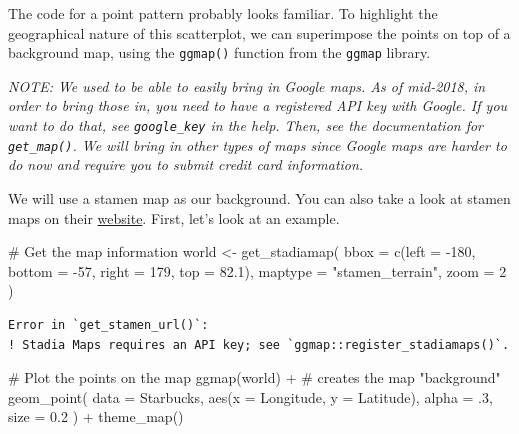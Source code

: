 \documentclass[
  letterpaper,
  DIV=11,
  numbers=noendperiod]{scrreprt}
\newenvironment{Shaded}{\begin{snugshade}}{\end{snugshade}}
\newcommand{\AttributeTok}[1]{\textcolor[rgb]{0.40,0.45,0.13}{#1}}
\newcommand{\CommentTok}[1]{\textcolor[rgb]{0.37,0.37,0.37}{#1}}
\newcommand{\DecValTok}[1]{\textcolor[rgb]{0.68,0.00,0.00}{#1}}
\newcommand{\FloatTok}[1]{\textcolor[rgb]{0.68,0.00,0.00}{#1}}
\newcommand{\FunctionTok}[1]{\textcolor[rgb]{0.28,0.35,0.67}{#1}}
\newcommand{\NormalTok}[1]{\textcolor[rgb]{0.00,0.23,0.31}{#1}}
\newcommand{\OtherTok}[1]{\textcolor[rgb]{0.00,0.23,0.31}{#1}}
\newcommand{\SpecialCharTok}[1]{\textcolor[rgb]{0.37,0.37,0.37}{#1}}
\newcommand{\StringTok}[1]{\textcolor[rgb]{0.13,0.47,0.30}{#1}}
\begin{document}
The code for a point pattern probably looks familiar. To highlight the
geographical nature of this scatterplot, we can superimpose the points
on top of a background map, using the \texttt{ggmap()} function from the
\texttt{ggmap} library.

\emph{NOTE: We used to be able to easily bring in Google maps. As of
mid-2018, in order to bring those in, you need to have a registered API
key with Google. If you want to do that, see \texttt{google\_key} in the
help. Then, see the documentation for \texttt{get\_map()}. We will bring
in other types of maps since Google maps are harder to do now and
require you to submit credit card information.}

We will use a stamen map as our background. You can also take a look at
stamen maps on their
\href{http://maps.stamen.com/\#watercolor/12/37.7706/-122.3782}{website}.
First, let's look at an example.

\begin{Shaded}
\begin{Highlighting}[]
\CommentTok{\# Get the map information}
\NormalTok{world }\OtherTok{\textless{}{-}} \FunctionTok{get\_stadiamap}\NormalTok{(}
  \AttributeTok{bbox =} \FunctionTok{c}\NormalTok{(}\AttributeTok{left =} \SpecialCharTok{{-}}\DecValTok{180}\NormalTok{, }\AttributeTok{bottom =} \SpecialCharTok{{-}}\DecValTok{57}\NormalTok{, }\AttributeTok{right =} \DecValTok{179}\NormalTok{, }\AttributeTok{top =} \FloatTok{82.1}\NormalTok{),}
  \AttributeTok{maptype =} \StringTok{"stamen\_terrain"}\NormalTok{,}
  \AttributeTok{zoom =} \DecValTok{2}
\NormalTok{)}
\end{Highlighting}
\end{Shaded}

\begin{verbatim}
Error in `get_stamen_url()`:
! Stadia Maps requires an API key; see `ggmap::register_stadiamaps()`.
\end{verbatim}

\begin{Shaded}
\begin{Highlighting}[]
\CommentTok{\# Plot the points on the map}
\FunctionTok{ggmap}\NormalTok{(world) }\SpecialCharTok{+} \CommentTok{\# creates the map "background"}
  \FunctionTok{geom\_point}\NormalTok{(}
    \AttributeTok{data =}\NormalTok{ Starbucks,}
    \FunctionTok{aes}\NormalTok{(}\AttributeTok{x =}\NormalTok{ Longitude, }\AttributeTok{y =}\NormalTok{ Latitude),}
    \AttributeTok{alpha =}\NormalTok{ .}\DecValTok{3}\NormalTok{,}
    \AttributeTok{size =} \FloatTok{0.2}
\NormalTok{  ) }\SpecialCharTok{+}
  \FunctionTok{theme\_map}\NormalTok{()}
\end{Highlighting}
\end{Shaded}
\end{document}
